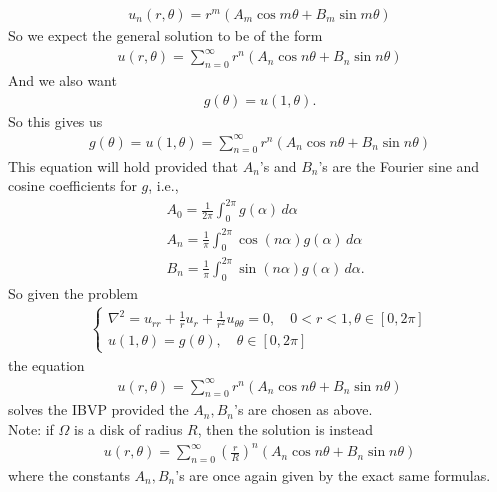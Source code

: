 \documentclass{article}
\theoremstyle{definition}
\newcommand{\f}[2]{\frac{#1}{#2}}
\begin{document}
\begin{align*}
\boxed{u_n(r,\theta) = r^m(A_m\cos m\theta + B_m\sin m\theta )}
\end{align*}
So we expect the general solution to be of the form
\begin{align*}
\boxed{u(r,\theta) = \sum^\infty_{n=0}r^n(A_n\cos n\theta + B_n\sin n\theta )}
\end{align*}
And we also want
\begin{align*}
g(\theta) = u(1,\theta).
\end{align*}
So this gives us
\begin{align*}
g(\theta) = u(1,\theta) = \sum^\infty_{n=0}r^n(A_n\cos n\theta + B_n\sin n\theta )
\end{align*}
This equation will hold provided that $A_n$'s and $B_n$'s are the Fourier sine and cosine coefficients for $g$, i.e., 
\begin{align*}
&A_0 = \f{1}{2\pi}\int^{2\pi}_0 g(\alpha)\,d\alpha\\
&A_n = \f{1}{\pi}\int^{2\pi}_0 \cos(n\alpha)g(\alpha)\,d\alpha\\
&B_n = \f{1}{\pi}\int^{2\pi}_0 \sin(n\alpha)g(\alpha)\,d\alpha.
\end{align*}
So given the problem 
\begin{align*}
\begin{cases}
\nabla^2 = u_{rr} + \frac{1}{r}u_r + \frac{1}{r^2}u_{\theta\theta} = 0, \quad 0<r<1, \theta\in[0,2\pi]\\
u(1,\theta) = g(\theta), \quad \theta \in [0,2\pi]
\end{cases}
\end{align*}
the equation 
\begin{align*}
\boxed{u(r,\theta) = \sum^\infty_{n=0}r^n(A_n\cos n\theta + B_n\sin n\theta )}
\end{align*}
solves the IBVP provided the $A_n,B_n$'s are chosen as above.\\

Note: if $\Omega$ is a disk of radius $R$, then the solution is instead
\begin{align*}
\boxed{u(r,\theta) = \sum^\infty_{n=0}\left(\f{r}{R}\right)^n(A_n\cos n\theta + B_n\sin n\theta )}
\end{align*}
where the constants $A_n,B_n$'s are once again given by the exact same formulas.\\
\end{document}
